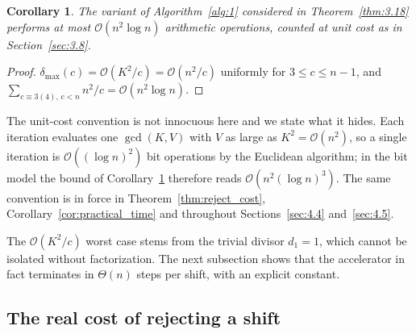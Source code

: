 \documentclass[11pt, a4paper]{article}
\theoremstyle{plain}
\newtheorem{corollary}[theorem]{Corollary}
\theoremstyle{definition}
\begin{document}
\begin{corollary} \label{cor:3.19}
The variant of Algorithm~\ref{alg:1} considered in Theorem~\ref{thm:3.18} performs at most $\mathcal{O}(n^2\log n)$ arithmetic operations, counted at unit cost as in Section~\ref{sec:3.8}.
\end{corollary}
\begin{proof}
$\delta_{\max}(c) = \mathcal{O}(K^2/c)=\mathcal{O}(n^2/c)$ uniformly for $3 \le c \le n-1$, and
$\sum_{c\equiv3(4),\,c<n} n^{2}/c = \mathcal{O}(n^2\log n)$.
\end{proof}

The unit-cost convention is not innocuous here and we state what it hides. Each iteration evaluates one $\gcd(K,V)$ with $V$ as large as $K^{2}=\mathcal{O}(n^{2})$, so a single iteration is $\mathcal{O}((\log n)^{2})$ bit operations by the Euclidean algorithm; in the bit model the bound of Corollary~\ref{cor:3.19} therefore reads $\mathcal{O}(n^{2}(\log n)^{3})$. The same convention is in force in Theorem~\ref{thm:reject_cost}, Corollary~\ref{cor:practical_time} and throughout Sections~\ref{sec:4.4} and~\ref{sec:4.5}.

The $\mathcal{O}(K^2/c)$ worst case stems from the trivial divisor $d_1=1$, which cannot be isolated without factorization. The next subsection shows that the accelerator in fact terminates in $\Theta(n)$ steps per shift, with an explicit constant.

\subsection{The real cost of rejecting a shift} \label{sec:3.10}
\end{document}
